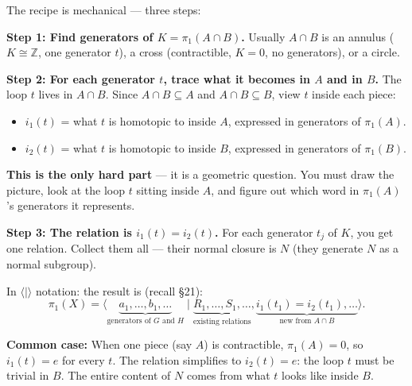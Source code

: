 \documentclass[11pt]{report}
\begin{document}
\begin{rembox}
The recipe is mechanical --- three steps:

\textbf{Step 1: Find generators of $K = \pi_1(A \cap B)$.} Usually $A \cap B$ is an annulus ($K \cong \mathbb{Z}$, one generator $t$), a cross (contractible, $K = 0$, no generators), or a circle.

\textbf{Step 2: For each generator $t$, trace what it becomes in $A$ and in $B$.} The loop $t$ lives in $A \cap B$. Since $A \cap B \subseteq A$ and $A \cap B \subseteq B$, view $t$ inside each piece:
\begin{itemize}[nosep]
    \item $i_1(t)$ = what $t$ is homotopic to inside $A$, expressed in generators of $\pi_1(A)$.
    \item $i_2(t)$ = what $t$ is homotopic to inside $B$, expressed in generators of $\pi_1(B)$.
\end{itemize}
\textbf{This is the only hard part} --- it is a geometric question. You must draw the picture, look at the loop $t$ sitting inside $A$, and figure out which word in $\pi_1(A)$'s generators it represents.

\textbf{Step 3: The relation is $i_1(t) = i_2(t)$.} For each generator $t_j$ of $K$, you get one relation. Collect them all --- their normal closure is $N$ (they generate $N$ as a normal subgroup).

In $\langle \mid \rangle$ notation: the result is (recall \S 21):
\[\pi_1(X) = \langle \underbrace{a_1, \ldots, b_1, \ldots}_{\text{generators of } G \text{ and } H} \mid \underbrace{R_1, \ldots, S_1, \ldots}_{\text{existing relations}}, \underbrace{i_1(t_1) = i_2(t_1), \ldots}_{\text{new from } A \cap B} \rangle.\]

\textbf{Common case:} When one piece (say $A$) is contractible, $\pi_1(A) = 0$, so $i_1(t) = e$ for every $t$. The relation simplifies to $i_2(t) = e$: the loop $t$ must be trivial in $B$. The entire content of $N$ comes from what $t$ looks like inside $B$.
\end{rembox}
\end{document}
